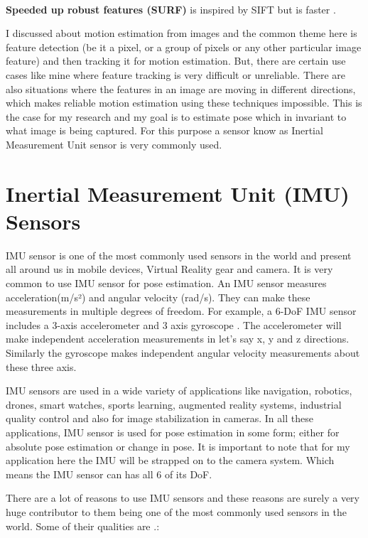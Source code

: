 \paragraph{}\textbf{Speeded up robust features (SURF)} is inspired by SIFT but is faster \citep{dis_surf}.

I discussed about motion estimation from images and the common theme here is feature detection (be it a pixel, or a group of pixels or any other particular image feature) and then tracking it for motion estimation. But, there are certain use cases like mine where feature tracking is very difficult or unreliable. There are also situations where the features in an image are moving in different directions, which makes reliable motion estimation using these techniques impossible. This is the case for my research and my goal is to estimate pose which in invariant to what image is being captured. For this purpose a sensor know as Inertial Measurement Unit sensor is very commonly used.  

\section{Inertial Measurement Unit (IMU) Sensors}
IMU sensor is one of the most commonly used sensors in the world and present all around us in mobile devices, Virtual Reality gear and camera. It is very common to use IMU sensor for pose estimation. An IMU sensor measures acceleration(m/s²) and angular velocity (rad/s).  They can make these measurements in multiple degrees of freedom. For example, a 6-DoF IMU sensor includes a 3-axis accelerometer and 3 axis gyroscope  \citep{constant2021data}. The accelerometer will make independent acceleration measurements in let's say x, y and z directions. Similarly the gyroscope makes independent angular velocity measurements about these three axis.

IMU sensors are used in a wide variety of applications like navigation, robotics, drones, smart watches, sports learning, augmented reality systems, industrial quality control \citep{ahmad2013reviews}  and also for image stabilization in cameras. In all these applications, IMU sensor is used for pose estimation in some form; either for absolute pose estimation or change in pose. It is important to note that for my application here the IMU will be strapped on to the camera system. Which means the IMU sensor can has all 6 of its DoF.

There are a lot of reasons to use IMU sensors and these reasons are surely a very huge contributor to them being one of the most commonly used sensors in the world. Some of their qualities are \citep{woodman2007introduction}.:

